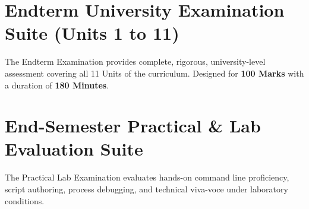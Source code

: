 \documentclass[a4paper,10pt,oneside,openany]{book}
\begin{document}
\newpage

\newpage


\chapter{Endterm University Examination Suite (Units 1 to 11)}
\label{chap:endterm}
\noindent
The Endterm Examination provides complete, rigorous, university-level assessment covering all 11 Units of the curriculum. Designed for \textbf{100 Marks} with a duration of \textbf{180 Minutes}.

\newpage

\newpage


\chapter{End-Semester Practical \& Lab Evaluation Suite}
\label{chap:lab_eval}
\noindent
The Practical Lab Examination evaluates hands-on command line proficiency, script authoring, process debugging, and technical viva-voce under laboratory conditions.

\newpage

\newpage

\end{document}

